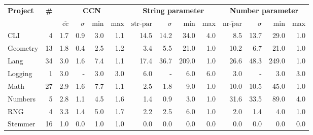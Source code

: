 \begin{tabular}{ l r | r@{\hskip 0.08in}r@{\hskip 0.08in}r@{\hskip 0.08in}r | r@{\hskip 0.08in}r@{\hskip 0.08in}r@{\hskip 0.08in}r | r@{\hskip 0.08in}r@{\hskip 0.08in}r@{\hskip 0.08in}r }
\hline 
\textbf{Project} & \textbf{\#} & \multicolumn{4}{c}{\textbf{CCN}} & \multicolumn{4}{c}{\textbf{String parameter}} & \multicolumn{4}{c}{\textbf{Number parameter}} \\ 
  &   & $\overline{\text{cc}}$ & $\sigma$ & min & max & $\overline{\text{str-par}}$ & $\sigma$ & min & max & $\overline{\text{nr-par}}$ & $\sigma$ & min & max \\ 
\hline 
CLI & 4 &1.7 &0.9 &3.0 & 1.1 &14.5 &14.2 &34.0 & 4.0 &8.5 &13.7 &29.0 & 1.0 \\ 
Geometry & 13 &1.8 &0.4 &2.5 & 1.2 &3.4 &5.5 &21.0 & 1.0 &10.2 &6.7 &21.0 & 1.0 \\ 
Lang & 34 &3.0 &1.6 &7.4 & 1.1 &17.4 &36.7 &209.0 & 1.0 &26.6 &48.3 &249.0 & 1.0 \\ 
Logging & 1 &3.0 &- &3.0 & 3.0 &6.0 &- &6.0 & 6.0 &3.0 &- &3.0 & 3.0 \\ 
Math & 27 &2.9 &1.6 &7.7 & 1.1 &2.5 &1.8 &9.0 & 1.0 &10.0 &10.5 &45.0 & 1.0 \\ 
Numbers & 5 &2.8 &1.1 &4.5 & 1.6 &1.4 &0.9 &3.0 & 1.0 &31.6 &33.5 &89.0 & 4.0 \\ 
RNG & 4 &3.3 &1.4 &5.0 & 1.7 &2.2 &2.5 &6.0 & 1.0 &2.0 &1.4 &4.0 & 1.0 \\ 
Stemmer & 16 &1.0 &0.0 &1.0 & 1.0 &0.0 &0.0 &0.0 & 0.0 &0.0 &0.0 &0.0 & 0.0 \\ 
\hline 
\end{tabular}